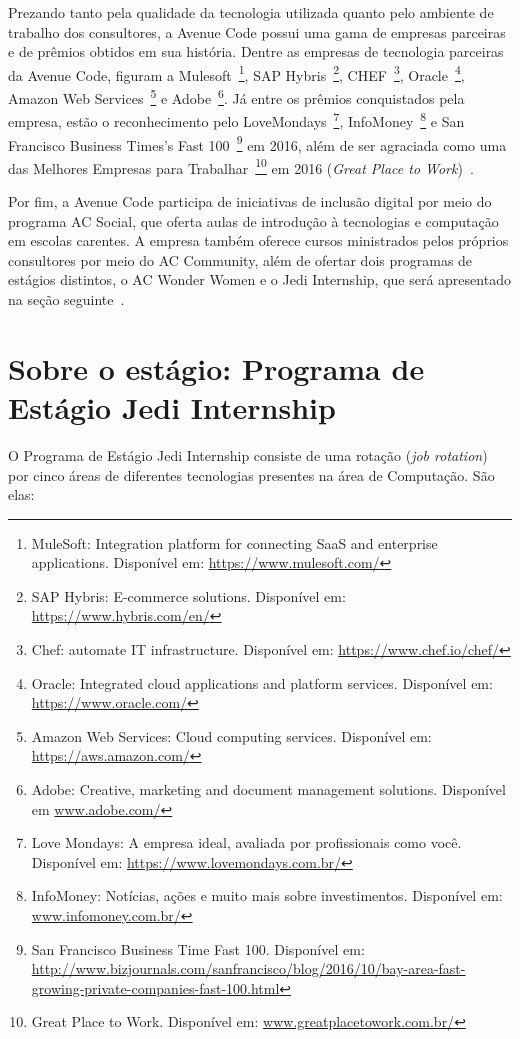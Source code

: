 Prezando tanto pela qualidade da tecnologia utilizada quanto pelo ambiente de trabalho dos consultores, a Avenue Code possui uma gama de empresas parceiras e de prêmios obtidos em sua história. Dentre as empresas de tecnologia parceiras da Avenue Code, figuram a Mulesoft~\footnote{MuleSoft: Integration platform for connecting SaaS and enterprise applications. Disponível em: \url{https://www.mulesoft.com/}}, SAP Hybris~\footnote{SAP Hybris: E-commerce solutions. Disponível em: \url{https://www.hybris.com/en/}}, CHEF~\footnote{Chef: automate IT infrastructure. Disponível em: \url{https://www.chef.io/chef/}}, Oracle~\footnote{Oracle: Integrated cloud applications and platform services. Disponível em: \url{https://www.oracle.com/}}, Amazon Web Services~\footnote{Amazon Web Services: Cloud computing services. Disponível em: \url{https://aws.amazon.com/}} e Adobe~\footnote{Adobe: Creative, marketing and document management solutions. Disponível em \url{www.adobe.com/}}. Já entre os prêmios conquistados pela empresa, estão o reconhecimento pelo LoveMondays~\footnote{Love Mondays: A empresa ideal, avaliada por profissionais como você. Disponível em: \url{https://www.lovemondays.com.br/}}, InfoMoney~\footnote{InfoMoney: Notícias, ações e muito mais sobre investimentos. Disponível em: \url{www.infomoney.com.br/}} e San Francisco Business Times's Fast 100~\footnote{San Francisco Business Time Fast 100. Disponível em: \url{http://www.bizjournals.com/sanfrancisco/blog/2016/10/bay-area-fast-growing-private-companies-fast-100.html}} em 2016, além de ser agraciada como uma das Melhores Empresas para Trabalhar~\footnote{Great Place to Work. Disponível em: \url{www.greatplacetowork.com.br/}} em 2016 (\textit{Great Place to Work})~\cite{avenuecode-2017}.

Por fim, a Avenue Code participa de iniciativas de inclusão digital por meio do programa AC Social, que oferta aulas de introdução à tecnologias e computação em escolas carentes. A empresa também oferece cursos ministrados pelos próprios consultores por meio do AC Community, além de ofertar dois programas de estágios distintos, o AC Wonder Women e o Jedi Internship, que será apresentado na seção seguinte~\cite{avenuecode-2017}.

\section{Sobre o estágio: Programa de Estágio Jedi Internship}
\label{sec:sobre-o-estagio}

O Programa de Estágio Jedi Internship consiste de uma rotação (\textit{job rotation}) por cinco áreas de diferentes tecnologias presentes na área de Computação. São elas:

